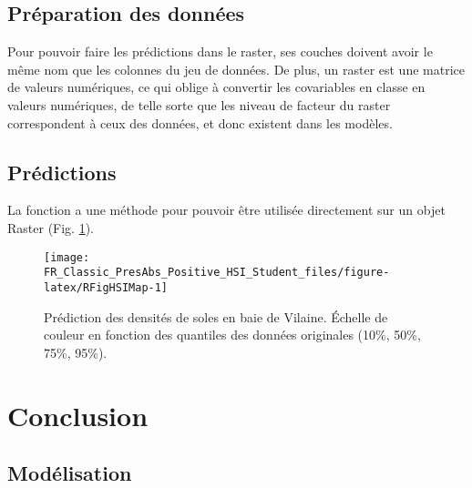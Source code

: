 \documentclass[french,a4paper]{article}
\begin{document}
\hypertarget{preparation-des-donnees}{%
\subsection{Préparation des données}\label{preparation-des-donnees}}

Pour pouvoir faire les prédictions dans le raster, ses couches doivent avoir le même nom que les colonnes du jeu de données. De plus, un raster est une matrice de valeurs numériques, ce qui oblige à convertir les covariables en classe en valeurs numériques, de telle sorte que les niveau de facteur du raster correspondent à ceux des données, et donc existent dans les modèles. 

\hypertarget{predictions}{%
\subsection{Prédictions}\label{predictions}}

La fonction  a une méthode pour pouvoir être utilisée directement sur un objet Raster (Fig. \ref{fig:RFigHSIMap}).



\begin{figure}[!h]

{\centering \texttt{[image: FR\_Classic\_PresAbs\_Positive\_HSI\_Student\_files/figure-latex/RFigHSIMap-1]} 

}

\caption{Prédiction des densités de soles en baie de Vilaine. Échelle de couleur en fonction des quantiles des données originales (10\%, 50\%, 75\%, 95\%).}\label{fig:RFigHSIMap}
\end{figure}

\hypertarget{conclusion}{%
\section{Conclusion}\label{conclusion}}

\hypertarget{modelisation}{%
\subsection{Modélisation}\label{modelisation}}
\end{document}

